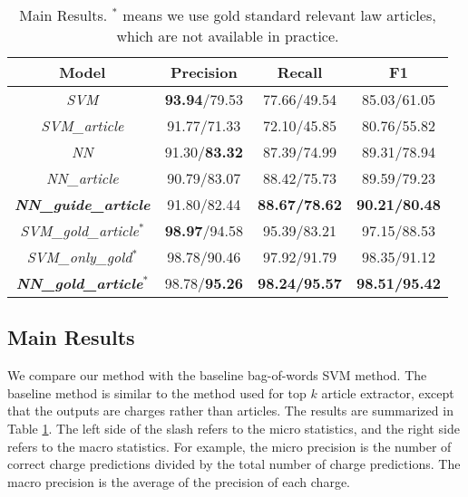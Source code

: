\begin{table}
\centering
\small{
\begin{tabular}{|c|c|c|c|}
\hline
\textbf{Model}				& \textbf{Precision} 	& \textbf{Recall} 		& \textbf{F1} 	\\
\hline
\textit{SVM} 				& \textbf{93.94}/79.53					& 77.66/49.54  					& 85.03/61.05 				 	\\
\hline
\textit{SVM\_article} 			& 91.77/71.33					& 72.10/45.85  					& 80.76/55.82				 	\\
\hline
\textit{NN}				& 91.30/\textbf{83.32}			& 87.39/74.99  					& 89.31/78.94					\\
\hline
\textit{NN\_article}			& 90.79/83.07					& 88.42/75.73  					& 89.59/79.23					\\
\hline
\textbf{\textit{NN\_guide\_article}} 	& 91.80/82.44 					& \textbf{88.67/78.62} 			& \textbf{90.21/80.48} 		 	\\
\hline
\hline
\textit{SVM\_gold\_article$^*$} 	& \textbf{98.97}/94.58			& 95.39/83.21  					& 97.15/88.53					\\
\hline
\textit{SVM\_only\_gold$^*$} 		& 98.78/90.46					& 97.92/91.79  					& 98.35/91.12					\\
\hline
\textbf{\textit{NN\_gold\_article$^*$}} 		& 98.78/\textbf{95.26} 			& \textbf{98.24/95.57} 			& \textbf{98.51/95.42} 			\\
\hline
\end{tabular}
}
\caption{Main Results. $^*$ means we use gold standard relevant law articles, which are not available in practice.}
\label{tabble_main_results}
\end{table}



\subsection{Main Results}
\label{sec_main_results}
We compare our method with the baseline bag-of-words SVM method. The baseline method is similar to the method used for top $k$ article extractor, except that the outputs are charges rather than articles. The results are summarized in Table \ref{tabble_main_results}. The left side of the slash refers to the micro statistics, and the right side refers to the macro statistics. For example, the micro precision is the number of correct charge predictions divided by the total number of charge predictions. The macro precision is the average of the precision of each charge. %

